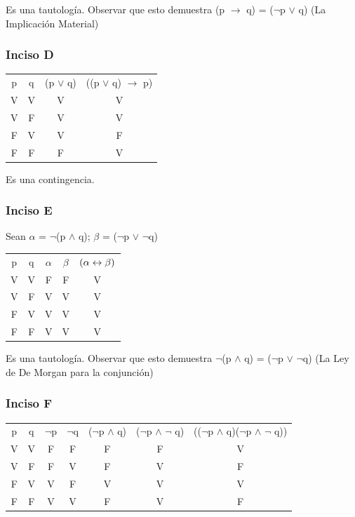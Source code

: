 	Es una tautología. Observar que esto demuestra (p $\rightarrow$ q) = ($\neg$p $\vee$ q) (La Implicación Material)
	
	\subsubsection{Inciso D}
	\begin{tabular}{c|c|c|c}
		p & q & (p $\vee$ q) & ((p $\vee$ q) $\rightarrow$ p) \\
		V & V & V              & V \\
		V & F & V              & V \\
		F & V & V              & F \\
		F & F & F              & V
	\end{tabular}
	
	Es una contingencia.
	
	\subsubsection{Inciso E}
	
	Sean $\alpha$ = $\neg$(p $\wedge$ q); $\beta$ = ($\neg$p $\vee$ $\neg$q)
	
	\begin{tabular}{c|c|c|c|c}
		p & q & $\alpha$ & $\beta$ & $(\alpha \leftrightarrow \beta)$\\
		V & V & F & F & V \\
		V & F & V & V & V \\ 
		F & V & V & V & V \\
		F & F & V & V & V 
	\end{tabular}
	
	Es una tautología. Observar que esto demuestra $\neg$(p $\wedge$ q) = ($\neg$p $\vee$ $\neg$q) (La Ley de De Morgan para la conjunción) 
	
	\subsubsection{Inciso F}
	\begin{tabular}{c|c|c|c|c|c|c}
		p & q & $\neg$p & $\neg$q & ($\neg$p $\wedge$ q) & ($\neg$p $\wedge$ $\neg$ q) & (($\neg$p $\wedge$ q)\Iff($\neg$p $\wedge$ $\neg$ q)) \\
		V & V & F & F & F & F & V \\
		V & F & F & V & F & V & F \\
		F & V & V & F & V & V & V \\
		F & F & V & V & F & V & F \\
	\end{tabular}
	
